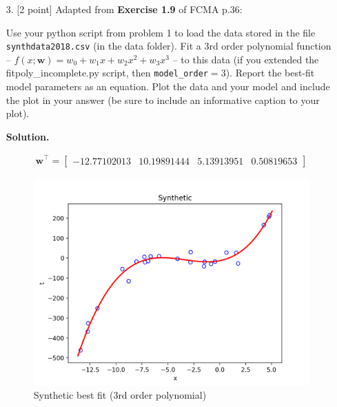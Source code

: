 \documentclass[10pt]{article}
\begin{document}
\begin{itemize}
\item[3.] [2 point]
Adapted from {\bf Exercise 1.9} of FCMA p.36:

Use your python script from problem 1 to load the data stored in the file {\tt synthdata2018.csv} (in the data folder).  Fit a 3rd order polynomial function -- $f(x; \mathbf{w}) = w_0 + w_1 x + w_2 x^2 + w_3 x^3$ -- to this data (if you extended the {fitpoly\_incomplete.py} script, then {\tt model\_order}$ = 3$).  
Report the best-fit model parameters as an equation.  Plot the data and your model and include the plot in your answer (be sure to include an informative caption to your plot).

{\bf Solution.} 


\begin{eqnarray*}
\mathbf{w}^\top = \begin{bmatrix} -12.77102013 & 10.19891444 & 5.13913951 & 0.50819653 \end{bmatrix}
\end{eqnarray*}

\begin{figure}
\centering
  \includegraphics[width=\linewidth]{code/synth.png}
 \caption{Synthetic best fit (3rd order polynomial)}
\label{label}
\end{figure}


\end{itemize}
\end{document}
